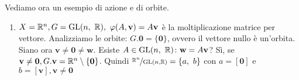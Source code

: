 Vediamo ora un esempio di azione e di orbite.
\begin{example}
	\begin{enumerate}
		\item $X=\realset^n, G=\gl(n,\ \realset), \ \phi(A,\mathbf{v})=A\mathbf{v}$ è la moltiplicazione matrice per vettore.\newline
		Analizziamo le orbite: $G.\mathbf{0}=\{\mathbf{0}\}$, ovvero il vettore nullo è un'orbita. Siano ora $\mathbf{v\neq 0\neq w}$. Esiste $A\in\operatorname{GL}(n,\ \mathbb{R}) \colon \mathbf{w}=A\mathbf{v}$? Sì, se $\mathbf{v\neq 0}, G.\mathbf{v}=\mathbb{R}^n\setminus\{\mathbf{0}\}$. \newline 
		Quindi $\nicefrac{\realset^n}{\gl(n, \realset)}=\{ a,\ b\}$ con $a=[\mathbf{0}]$ e $b=[\mathbf{v}], \mathbf{v\neq 0}$
	\end{enumerate}
\end{example}


